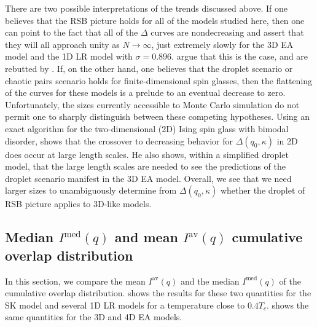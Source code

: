 There are two possible interpretations of the trends discussed above. If one
believes that the RSB picture holds for all of the models studied here, then
one can point to the fact that all of the $\Delta$ curves are nondecreasing and
assert that they will all approach unity as $N \to \infty$, just extremely
slowly for the 3D EA model and the 1D LR model with $\sigma=0.896$.
\textcite{billoire2013comment} argue that this is the case, and are rebutted by
\textcite{yucesoy2013yucesoy}. If, on the other hand, one believes that the
droplet scenario or chaotic pairs scenario holds for finite-dimensional spin
glasses, then the flattening of the curves for these models is a prelude to an
eventual decrease to zero. Unfortunately, the sizes currently accessible to
Monte Carlo simulation do not permit one to sharply distinguish between these
competing hypotheses. Using an exact algorithm for the two-dimensional (2D)
Ising spin glass with bimodal disorder, \textcite{middleton2013extracting}
shows that the crossover to decreasing behavior for $\Delta(q_0,\kappa)$ in 2D
does occur at large length scales. He also shows, within a simplified droplet
model, that the large length scales are needed to see the predictions of the
droplet scenario manifest in the 3D EA model. Overall, we see that we need
larger sizes to unambiguously determine from $\Delta(q_0,\kappa)$ whether the
droplet of RSB picture applies to 3D-like models.


\subsection{Median $I^{\mathrm{med}}(q)$ and mean $I^{\mathrm{av}}(q)$
  cumulative overlap distribution}
\label{sec:overlap-results-cumulative}

In this section, we compare the mean $I^{\mathrm{av}}(q)$ and the median
$I^{\mathrm{med}}(q)$ of the cumulative overlap distribution.
 shows the results for these two quantities for
the SK model and several 1D LR models for a temperature close to $0.4 T_c$.
 shows the same quantities for the 3D and 4D EA
models.

